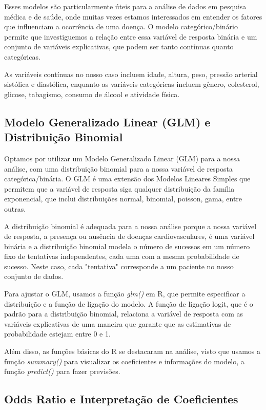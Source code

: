 \documentclass[article,11pt,a4paper,brazil]{abntex2}
\begin{document}
	Esses modelos são particularmente úteis para a análise de dados em pesquisa médica e de saúde, onde muitas vezes estamos interessados em entender os fatores que influenciam a ocorrência de uma doença. O modelo categórico/binário permite que investiguemos a relação entre essa variável de resposta binária e um conjunto de variáveis explicativas, que podem ser tanto contínuas quanto categóricas. 
	
	As variáveis contínuas no nosso caso incluem idade, altura, peso, pressão arterial sistólica e diastólica, enquanto as variáveis categóricas incluem gênero, colesterol, glicose, tabagismo, consumo de álcool e atividade física.
	
	\subsection{Modelo Generalizado Linear (GLM) e Distribuição Binomial}
	
	Optamos por utilizar um Modelo Generalizado Linear (GLM) para a nossa análise, com uma distribuição binomial para a nossa variável de resposta categórica/binária. O GLM é uma extensão dos Modelos Lineares Simples que permitem que a variável de resposta siga qualquer distribuição da família exponencial, que inclui distribuições normal, binomial, poisson, gama, entre outras. 
	
	A distribuição binomial é adequada para a nossa análise porque a nossa variável de resposta, a presença ou ausência de doenças cardiovasculares, é uma variável binária e a distribuição binomial modela o número de sucessos em um número fixo de tentativas independentes, cada uma com a mesma probabilidade de sucesso. Neste caso, cada "tentativa" corresponde a um paciente no nosso conjunto de dados.
	
	Para ajustar o GLM, usamos a função \textit{glm()} em R, que permite especificar a distribuição e a função de ligação do modelo. A função de ligação logit, que é o padrão para a distribuição binomial, relaciona a variável de resposta com as variáveis explicativas de uma maneira que garante que as estimativas de probabilidade estejam entre 0 e 1. 
	
	Além disso, as funções básicas do R se destacaram na análise, visto que usamos a função \textit{summary()} para visualizar os coeficientes e informações do modelo, a função \textit{predict()} para fazer previsões.
	
	\subsection{Odds Ratio e Interpretação de Coeficientes}
	
\end{document}
